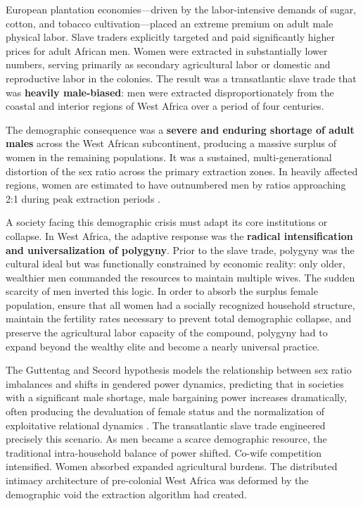 European plantation economies---driven by the labor-intensive demands of sugar, cotton, and tobacco cultivation---placed an extreme premium on adult male physical labor. Slave traders explicitly targeted and paid significantly higher prices for adult African men. Women were extracted in substantially lower numbers, serving primarily as secondary agricultural labor or domestic and reproductive labor in the colonies. The result was a transatlantic slave trade that was \textbf{heavily male-biased}: men were extracted disproportionately from the coastal and interior regions of West Africa over a period of four centuries.

The demographic consequence was a \textbf{severe and enduring shortage of adult males} across the West African subcontinent, producing a massive surplus of women in the remaining populations. It was a sustained, multi-generational distortion of the sex ratio across the primary extraction zones. In heavily affected regions, women are estimated to have outnumbered men by ratios approaching 2:1 during peak extraction periods \cite{slave_trade_polygyny_unl}.

A society facing this demographic crisis must adapt its core institutions or collapse. In West Africa, the adaptive response was the \textbf{radical intensification and universalization of polygyny}. Prior to the slave trade, polygyny was the cultural ideal but was functionally constrained by economic reality: only older, wealthier men commanded the resources to maintain multiple wives. The sudden scarcity of men inverted this logic. In order to absorb the surplus female population, ensure that all women had a socially recognized household structure, maintain the fertility rates necessary to prevent total demographic collapse, and preserve the agricultural labor capacity of the compound, polygyny had to expand beyond the wealthy elite and become a nearly universal practice.

The Guttentag and Secord hypothesis models the relationship between sex ratio imbalances and shifts in gendered power dynamics, predicting that in societies with a significant male shortage, male bargaining power increases dramatically, often producing the devaluation of female status and the normalization of exploitative relational dynamics \cite{slave_trade_polygyny_unl}. The transatlantic slave trade engineered precisely this scenario. As men became a scarce demographic resource, the traditional intra-household balance of power shifted. Co-wife competition intensified. Women absorbed expanded agricultural burdens. The distributed intimacy architecture of pre-colonial West Africa was deformed by the demographic void the extraction algorithm had created.

